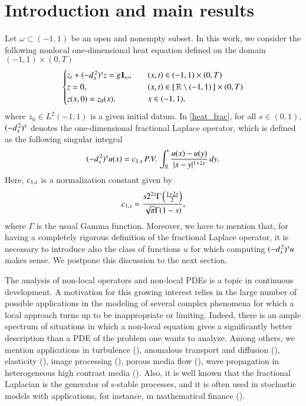 \section{Introduction and main results}\label{intro_sec}
Let $\omega\subset (-1,1)$ be an open and nonempty subset. In this work, we consider the following nonlocal one-dimensional heat equation defined on the domain $(-1,1)\times(0,T)$
\begin{align}\label{heat_frac}
	\begin{cases}
		z_t + (-d_x^{\,2})^{s}z = g\mathbf{1}_{\omega},\quad & (x,t)\in (-1,1)\times(0,T)
		\\
		z=0, & (x,t)\in[\,\mathbb{R}\setminus (-1,1)\,]\times(0,T)
		\\
		z(x,0)=z_0(x), & x\in (-1,1),
	\end{cases}
\end{align} 
where $z_0\in L^2(-1,1)$ is a given initial datum. In \eqref{heat_frac}, for all $s\in(0,1)$, $(-d_x^{\,2})^{s}$ denotes the one-dimensional fractional Laplace operator, which is defined as the following singular integral
\begin{align}\label{fl_intro}
	(-d_x^{\,2})^{s}u(x) = c_{1,s}\,P.V.\,\int_{\mathbb{R}}\frac{u(x)-u(y)}{|x-y|^{1+2s}}\,dy. 
\end{align}
Here, $c_{1,s}$ is a normalization constant given by
\begin{align*}
	c_{1,s} = \frac{s2^{2s}\Gamma\left(\frac{1+2s}{2}\right)}{\sqrt{\pi}\Gamma(1-s)},
\end{align*}
where $\Gamma$ is the usual Gamma function. Moreover, we have to mention that, for having a completely rigorous definition of the fractional Laplace operator, it is necessary to introduce also the class of functions $u$ for which computing $(-d_x^{\,2})^{s}u$ makes sense. We postpone this discussion to the next section.

The analysis of non-local operators and non-local PDEs is a topic in continuous development.
A motivation for this growing interest relies in the large number of possible applications in the modeling of several complex phenomena for which a local approach turns up to be inappropriate or limiting.
Indeed, there is an ample spectrum of situations in which a non-local equation gives a
significantly better description than a PDE of the problem one wants to analyze.
Among others, we mention applications in turbulence (\cite{bakunin2008turbulence}), anomalous transport and diffusion (\cite{bologna2000anomalous,meerschaert2012fractional}), elasticity (\cite{dipierro2015dislocation}), image processing (\cite{gilboa2008nonlocal}), porous media flow (\cite{vazquez2012nonlinear}), wave propagation in heterogeneous high contrast media (\cite{zhu2014modeling}). Also, it is well known that the fractional Laplacian is the generator of s-stable processes, and it is often used in stochastic models with applications, for instance, in mathematical finance (\cite{levendorskii2004pricing,pham1997optimal}).

